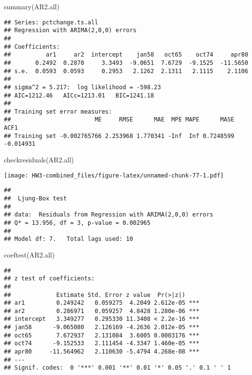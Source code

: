 \documentclass[
]{article}
\newenvironment{Shaded}{\begin{snugshade}}{\end{snugshade}}
\newcommand{\FunctionTok}[1]{\textcolor[rgb]{0.00,0.00,0.00}{#1}}
\newcommand{\NormalTok}[1]{#1}
\begin{document}
\begin{Shaded}
\begin{Highlighting}[]
\FunctionTok{summary}\NormalTok{(AR2.all)}
\end{Highlighting}
\end{Shaded}

\begin{verbatim}
## Series: pctchange.ts.all 
## Regression with ARIMA(2,0,0) errors 
## 
## Coefficients:
##          ar1     ar2  intercept    jan58   oct65    oct74     apr80
##       0.2492  0.2870     3.3493  -9.0651  7.6729  -9.1525  -11.5650
## s.e.  0.0593  0.0593     0.2953   2.1262  2.1311   2.1115    2.1106
## 
## sigma^2 = 5.217:  log likelihood = -598.23
## AIC=1212.46   AICc=1213.01   BIC=1241.18
## 
## Training set error measures:
##                        ME     RMSE      MAE  MPE MAPE      MASE      ACF1
## Training set -0.002765766 2.253968 1.770341 -Inf  Inf 0.7248599 -0.014931
\end{verbatim}

\begin{Shaded}
\begin{Highlighting}[]
\FunctionTok{checkresiduals}\NormalTok{(AR2.all)}
\end{Highlighting}
\end{Shaded}

\texttt{[image: HW3-combined\_files/figure-latex/unnamed-chunk-77-1.pdf]}

\begin{verbatim}
## 
##  Ljung-Box test
## 
## data:  Residuals from Regression with ARIMA(2,0,0) errors
## Q* = 13.956, df = 3, p-value = 0.002965
## 
## Model df: 7.   Total lags used: 10
\end{verbatim}

\begin{Shaded}
\begin{Highlighting}[]
\FunctionTok{coeftest}\NormalTok{(AR2.all)}
\end{Highlighting}
\end{Shaded}

\begin{verbatim}
## 
## z test of coefficients:
## 
##             Estimate Std. Error z value  Pr(>|z|)    
## ar1         0.249242   0.059275  4.2049 2.612e-05 ***
## ar2         0.286971   0.059257  4.8428 1.280e-06 ***
## intercept   3.349277   0.295330 11.3408 < 2.2e-16 ***
## jan58      -9.065080   2.126169 -4.2636 2.012e-05 ***
## oct65       7.672937   2.131084  3.6005 0.0003176 ***
## oct74      -9.152533   2.111454 -4.3347 1.460e-05 ***
## apr80     -11.564962   2.110630 -5.4794 4.268e-08 ***
## ---
## Signif. codes:  0 '***' 0.001 '**' 0.01 '*' 0.05 '.' 0.1 ' ' 1
\end{verbatim}
\end{document}
